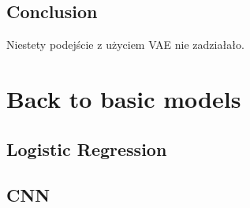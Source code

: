\subsection{Conclusion}

Niestety podejście z użyciem VAE nie zadziałało.

\section{Back to basic models}

\subsection{Logistic Regression}

\begin{figure}[h!]
    \centering
    \caption{}
    \label{fig:logreg_mask}
\end{figure}

\begin{figure}[h!]
    \centering
    \caption{}
    \label{fig:logreg_dsc}
\end{figure}

\subsection{CNN}





